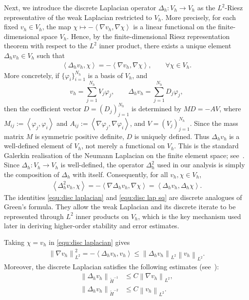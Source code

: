 \documentclass[11pt, reqno]{amsart}
\theoremstyle{definition}
\numberwithin{equation}{section}
\newcommand{\norm}[2]{\left\|{#1}\right\|_{#2}}
\newcommand{\inpro}[2]{\left\langle#1,#2\right\rangle}
\begin{document}
{
Next, we introduce the discrete Laplacian operator $\Delta_h:V_h\to V_h$ as the
	$L^2$-Riesz representative of the weak Laplacian restricted to $V_h$. More precisely, for each fixed $v_h\in V_h$, the map $\chi\mapsto -\inpro{\nabla v_h}{\nabla \chi}$
	is a linear functional on the finite-dimensional space $V_h$. Hence, by the
	finite-dimensional Riesz representation theorem with respect to the $L^2$ inner
	product, there exists a unique element $\Delta_h v_h\in V_h$ such that
	\begin{align}\label{equ:disc laplacian}
		\inpro{\Delta_h v_h}{\chi}
		=
		-\inpro{\nabla v_h}{\nabla \chi},
		\qquad
		\forall \chi\in V_h.
	\end{align}
	More concretely, if $\{\varphi_i\}_{i=1}^{N_h}$ is a basis of $V_h$, and
	\[
	v_h=\sum_{j=1}^{N_h} V_j\varphi_j,
	\qquad
	\Delta_h v_h=\sum_{j=1}^{N_h} D_j\varphi_j,
	\]
	then the coefficient vector $D=(D_j)_{j=1}^{N_h}$ is determined by $MD=-AV$, where
	$M_{ij}:=\inpro{\varphi_j}{\varphi_i}$ and $A_{ij}:=\inpro{\nabla\varphi_j}{\nabla\varphi_i}$, and $V=(V_j)_{j=1}^{N_h}$.
	Since the mass matrix $M$ is symmetric positive definite, $D$ is uniquely defined.
	Thus $\Delta_h v_h$ is a well-defined element of $V_h$, not merely a functional on
	$V_h$. This is the standard Galerkin realisation of the Neumann Laplacian on the
	finite element space; see~\cite[Chapter~1]{Tho06}. Since $\Delta_h:V_h\to V_h$ is well-defined, the operator $\Delta_h^2$ used in our analysis is simply the composition of $\Delta_h$ with itself. Consequently, for all $v_h, \chi\in V_h$,
	\begin{align}\label{equ:disc lap sq}
		\inpro{\Delta_h^2 v_h}{\chi}= -\inpro{\nabla\Delta_h v_h}{\nabla \chi}= \inpro{\Delta_h v_h}{\Delta_h \chi}.
	\end{align}
	The identities \eqref{equ:disc laplacian} and \eqref{equ:disc lap sq} are discrete analogues of Green's formula. They allow the weak Laplacian and its discrete iterate to be represented through $L^2$ inner products on $V_h$, which is the key mechanism used later in deriving higher-order stability and error estimates.
}

Taking $\chi=v_h$ in \eqref{equ:disc laplacian} gives
\begin{align}
	\label{equ:nab disc lap}
	\norm{\nabla v_h}{L^2}^2
	=
	-\inpro{\Delta_h v_h}{v_h}
	\leq
	\norm{\Delta_h v_h}{L^2}\norm{v_h}{L^2}.
\end{align}
Moreover, the discrete Laplacian satisfies the following estimates
(see~\cite[Lemma~2 and Lemma~9]{CheMaoShe20}):
\begin{align}
	\label{equ:disc lap H-1}
	\norm{\Delta_h v_h}{\widetilde{H}^{-1}}
	&\leq C \norm{\nabla v_h}{L^2},
	\\
	\label{equ:disc lap H-2}
	\norm{\Delta_h v_h}{\widetilde{H}^{-2}}
	&\leq C \norm{v_h}{L^2}.
\end{align}
\end{document}

